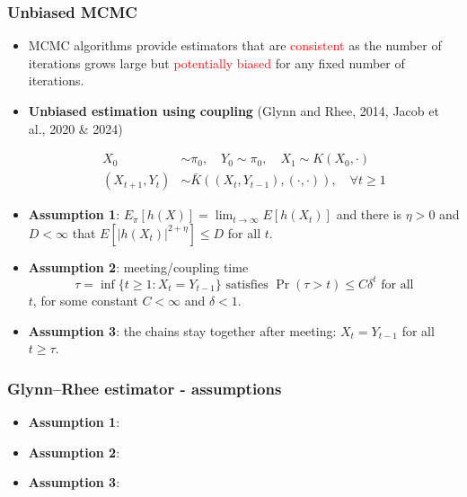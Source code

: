 \documentclass[aspectratio=169]{beamer}
\begin{document}
\begin{frame}
	\frametitle{Unbiased MCMC}

	\begin{itemize}
		\item MCMC algorithms provide estimators that are \textcolor{red}{consistent} as the number of iterations grows large but \textcolor{red}{potentially biased} for any fixed number of iterations.

		\item \textbf{Unbiased estimation using coupling} (Glynn and Rhee, 2014, Jacob et al., 2020 \& 2024)

		      \begin{align*}
			      X_0            & \sim \pi_0, \quad Y_0 \sim \pi_0, \quad X_1 \sim K(X_0, \cdot)       \\
			      (X_{t+1}, Y_t) & \sim \bar{K}((X_t, Y_{t-1}), (\cdot, \cdot)), \quad \forall t \geq 1
		      \end{align*}

		\item \textbf{Assumption 1}: $E_\pi[h(X)] = \lim_{t \to \infty} E[h(X_t)]$ and there is $\eta > 0$ and $D < \infty$ that $E[|h(X_t)|^{2+\eta}] \leq D$ for all $t$.

		\item \textbf{Assumption 2}: meeting/coupling time
		      \[
			      \tau = \inf\{t \geq 1 : X_t = Y_{t-1}\} \text{ satisfies } \Pr(\tau > t) \leq C\delta^t \text{ for all}
		      \]
		      $t$, for some constant $C < \infty$ and $\delta < 1$.

		\item \textbf{Assumption 3}: the chains stay together after meeting: $X_t = Y_{t-1}$ for all $t \geq \tau$.

	\end{itemize}

\end{frame}

\begin{frame}
	\frametitle{Glynn--Rhee estimator - assumptions}
	\begin{itemize}
		\item \textbf{Assumption 1}:
		\item \textbf{Assumption 2}:
		\item \textbf{Assumption 3}:
	\end{itemize}
\end{frame}
\end{document}
